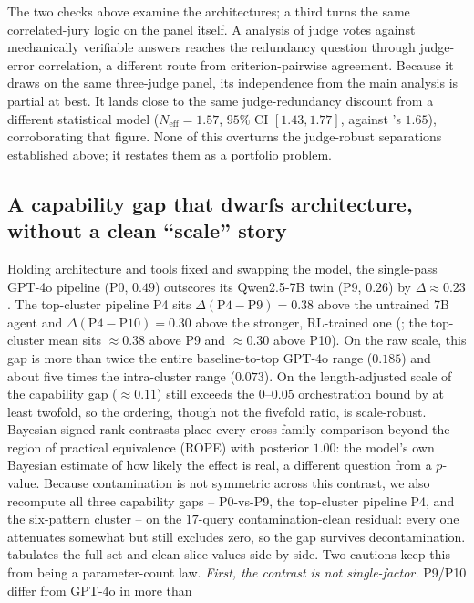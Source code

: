 \documentclass[11pt]{article}
\begin{document}
The two checks above examine the architectures; a third turns the same correlated-jury
logic on the panel itself. A \citet{ladha1992condorcet} analysis of
judge votes against mechanically verifiable answers reaches the redundancy question
through judge-error correlation, a different route from criterion-pairwise agreement.
Because it draws on the same three-judge panel, its independence from the main analysis
is partial at best. It lands close to the same judge-redundancy
discount from a different statistical model ($N_{\text{eff}}=1.57$, $95\%$ CI $[1.43,
1.77]$, against 's $1.65$), corroborating that figure.
None of this overturns the judge-robust separations established above; it restates them
as a portfolio problem.
\subsection{A capability gap that dwarfs architecture, without a clean ``scale'' story}\label{sec:scale}
Holding architecture and tools fixed and swapping the model, the single-pass GPT-4o
pipeline (P0, $0.49$) outscores its Qwen2.5-7B twin (P9, $0.26$) by $\Delta\approx0.23$.
The top-cluster pipeline P4 sits $\Delta(\text{P4}{-}\text{P9})=0.38$ above the
untrained 7B agent and $\Delta(\text{P4}{-}\text{P10})=0.30$ above the stronger,
RL-trained one (; the top-cluster mean sits $\approx\!0.38$ above P9 and
$\approx\!0.30$ above P10). On the raw scale, this gap is more than twice the entire
baseline-to-top GPT-4o range ($0.185$) and about five times the intra-cluster range
($0.073$). On the length-adjusted scale of  the capability gap
($\approx\!0.11$) still exceeds the $0$--$0.05$ orchestration bound by at least twofold,
so the ordering, though not the fivefold ratio, is scale-robust. Bayesian signed-rank
contrasts place every cross-family comparison beyond the region of practical equivalence
(ROPE) with posterior $1.00$: the model's own Bayesian estimate of how likely the effect
is real, a different question from a $p$-value. Because
contamination is not symmetric across this contrast, we also
recompute all three capability gaps -- P0-vs-P9, the top-cluster pipeline P4, and the
six-pattern cluster -- on the $17$-query
contamination-clean residual: every one attenuates somewhat but still excludes zero, so
the gap survives decontamination.  tabulates the full-set and
clean-slice values side by side. Two cautions keep this from being a parameter-count law.
\emph{First, the contrast is not single-factor.} P9/P10 differ from GPT-4o in more than
\end{document}
